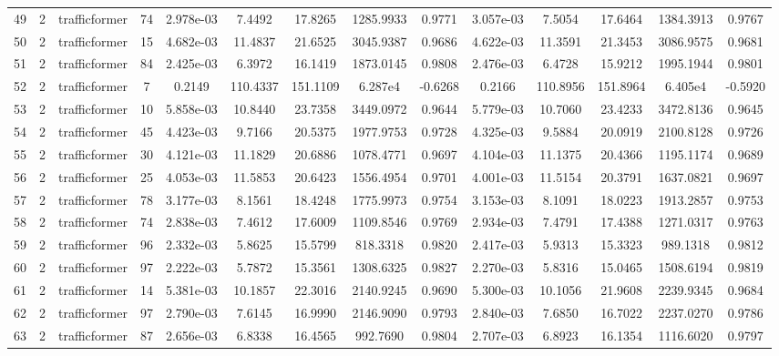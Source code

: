 \begin{landscape}
\begin{longtable}{c c c c c c c c c c c c c c}
	49 & 2 & trafficformer & 74 & 2.978e-03 & 7.4492 & 17.8265 & 1285.9933 & 0.9771 & 3.057e-03 & 7.5054 & 17.6464 & 1384.3913 & 0.9767 \\
	50 & 2 & trafficformer & 15 & 4.682e-03 & 11.4837 & 21.6525 & 3045.9387 & 0.9686 & 4.622e-03 & 11.3591 & 21.3453 & 3086.9575 & 0.9681 \\
	51 & 2 & trafficformer & 84 & 2.425e-03 & 6.3972 & 16.1419 & 1873.0145 & 0.9808 & 2.476e-03 & 6.4728 & 15.9212 & 1995.1944 & 0.9801 \\
	52 & 2 & trafficformer & 7 & 0.2149 & 110.4337 & 151.1109 & 6.287e4 & -0.6268 & 0.2166 & 110.8956 & 151.8964 & 6.405e4 & -0.5920 \\
	53 & 2 & trafficformer & 10 & 5.858e-03 & 10.8440 & 23.7358 & 3449.0972 & 0.9644 & 5.779e-03 & 10.7060 & 23.4233 & 3472.8136 & 0.9645 \\
	54 & 2 & trafficformer & 45 & 4.423e-03 & 9.7166 & 20.5375 & 1977.9753 & 0.9728 & 4.325e-03 & 9.5884 & 20.0919 & 2100.8128 & 0.9726 \\
	55 & 2 & trafficformer & 30 & 4.121e-03 & 11.1829 & 20.6886 & 1078.4771 & 0.9697 & 4.104e-03 & 11.1375 & 20.4366 & 1195.1174 & 0.9689 \\
	56 & 2 & trafficformer & 25 & 4.053e-03 & 11.5853 & 20.6423 & 1556.4954 & 0.9701 & 4.001e-03 & 11.5154 & 20.3791 & 1637.0821 & 0.9697 \\
	57 & 2 & trafficformer & 78 & 3.177e-03 & 8.1561 & 18.4248 & 1775.9973 & 0.9754 & 3.153e-03 & 8.1091 & 18.0223 & 1913.2857 & 0.9753 \\
	58 & 2 & trafficformer & 74 & 2.838e-03 & 7.4612 & 17.6009 & 1109.8546 & 0.9769 & 2.934e-03 & 7.4791 & 17.4388 & 1271.0317 & 0.9763 \\
	59 & 2 & trafficformer & 96 & 2.332e-03 & 5.8625 & 15.5799 & 818.3318 & 0.9820 & 2.417e-03 & 5.9313 & 15.3323 & 989.1318 & 0.9812 \\
	60 & 2 & trafficformer & 97 & 2.222e-03 & 5.7872 & 15.3561 & 1308.6325 & 0.9827 & 2.270e-03 & 5.8316 & 15.0465 & 1508.6194 & 0.9819 \\
	61 & 2 & trafficformer & 14 & 5.381e-03 & 10.1857 & 22.3016 & 2140.9245 & 0.9690 & 5.300e-03 & 10.1056 & 21.9608 & 2239.9345 & 0.9684 \\
	62 & 2 & trafficformer & 97 & 2.790e-03 & 7.6145 & 16.9990 & 2146.9090 & 0.9793 & 2.840e-03 & 7.6850 & 16.7022 & 2237.0270 & 0.9786 \\
	63 & 2 & trafficformer & 87 & 2.656e-03 & 6.8338 & 16.4565 & 992.7690 & 0.9804 & 2.707e-03 & 6.8923 & 16.1354 & 1116.6020 & 0.9797 \\

\end{longtable}
\end{landscape}
